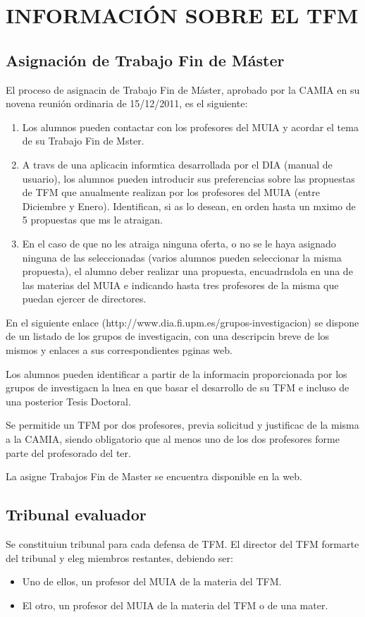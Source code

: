 \section{INFORMACIÓN SOBRE EL TFM}

\subsection{Asignación de Trabajo Fin de Máster}
\noindent El proceso de asignacin de Trabajo Fin de Máster, aprobado por la CAMIA en su novena reunión ordinaria de 15/12/2011, es el siguiente:
\begin{enumerate}
    \item Los alumnos pueden contactar con los profesores del MUIA y acordar el tema de su Trabajo Fin de Mster.
    \item A travs de una aplicacin informtica desarrollada por el DIA (manual de usuario), los alumnos pueden introducir sus preferencias sobre las propuestas de TFM que anualmente realizan por los profesores del MUIA (entre Diciembre y Enero). Identifican, si as lo desean, en orden hasta un mximo de 5 propuestas que ms le atraigan.
    \item En el caso de que no les atraiga ninguna oferta, o no se le haya asignado ninguna de las seleccionadas (varios alumnos pueden seleccionar la misma propuesta), el alumno deber realizar una propuesta, encuadrndola en una de las materias del MUIA e indicando hasta tres profesores de la misma que puedan ejercer de directores.
\end{enumerate}

En el siguiente enlace (http://www.dia.fi.upm.es/grupos-investigacion) se dispone de un listado de los grupos de investigacin, con una descripcin breve de los mismos y enlaces a sus correspondientes pginas web.

Los alumnos pueden identificar a partir de la informacin proporcionada por los grupos de investigacn la lnea en que basar el desarrollo de su TFM e incluso de una posterior Tesis Doctoral.

Se permitide un TFM por dos profesores, previa solicitud y justificac de la misma a la CAMIA, siendo obligatorio que al menos uno de los dos profesores forme parte del profesorado del ter.

La asigne Trabajos Fin de Master se encuentra disponible en la web.



\subsection{Tribunal evaluador}
\noindent Se constituiun tribunal para cada defensa de TFM. El director del TFM formarte del tribunal y eleg miembros restantes, debiendo ser:
\begin{itemize}
    \item Uno de ellos, un profesor del MUIA de la materia del TFM.
    \item  El otro, un profesor del MUIA de la materia del TFM o de una mater.
\end{itemize}

